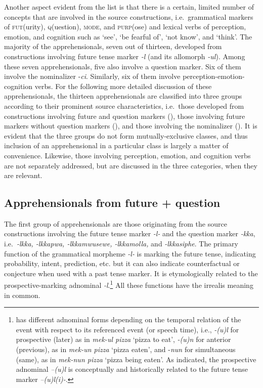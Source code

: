 \documentclass[output=paper,colorlinks,citecolor=brown]{langscibook}
\begin{document}
Another aspect evident from the list is that there is a certain, limited number of concepts that are involved in the source constructions, i.e.\  grammatical markers of \textsc{fut}(urity), \textsc{q}(uestion), \textsc{mode}, and \textsc{purp}(ose) and lexical verbs of perception, emotion, and cognition such as `see', `be fearful of', `not know', and `think'. The majority of the apprehensionals, seven out of thirteen, developed from constructions involving future tense marker \textit{-l} (and its allomorph \textit{-ul}). Among these seven apprehensionals, five also involve a question marker. Six of them involve the nominalizer \nobreakdash-\textit{ci}. Similarly, six of them involve perception-emotion-cognition verbs. For the following more detailed discussion of these apprehensionals, the thirteen apprehensionals are classified into three groups according to their prominent source characteristics, i.e.\  those developed from constructions involving future and question markers (), those involving future markers without question markers (), and those involving the nominalizer (). It is evident that the three groups do not form mutually-exclusive classes, and thus inclusion of an apprehensional in a particular class is largely a matter of convenience. Likewise, those involving perception, emotion, and cognition verbs are not separately addressed, but are discussed in the three categories, when they are relevant.



\subsection{Apprehensionals from future + question}
\label{subsec:futurequestion}
\largerpage

The first group of apprehensionals are those originating from the source constructions involving the future tense marker \textit{-l-} and the question marker \textit{-kka}, i.e.\  \textit{-lkka, -lkkapwa, -lkkamwusewe, -lkkamolla,} and \textit{-lkkasiphe}. The primary function of the grammatical morpheme \textit{-l-} is marking the future tense, indicating probability, intent, prediction, etc. but it can also indicate counterfactual or conjecture when used with a past tense marker. It is etymologically related to the prospective-marking adnominal \textit{-l}.\footnote{ has different adnominal forms depending on the temporal relation of the event with respect to its referenced event (or speech time), i.e., \textit{-(u)l} for prospective (later) as in \textit{mek-ul pizza} `pizza to eat', \textit{-(u)n} for anterior (previous), as in \textit{mek-un pizza} `pizza eaten', and \nobreakdash-\textit{nun} for simultaneous (same), as in \textit{mek-nun pizza} `pizza being eaten'. As indicated, the prospective adnominal \textit{–(u)l} is conceptually and historically related to the future tense marker \textit{–(u)l(i)-}.} All these functions have the irrealis meaning in common.
\end{document}
